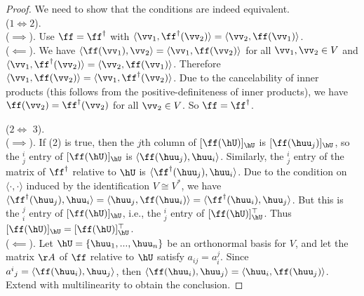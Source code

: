 \begin{proof}
    \mbox{} We need to show that the conditions are indeed equivalent.
    \\ \indent ($1 \iff 2$).
    \\ \indent ($\implies$). Use $\ff = \ff^\dag$ with $\langle \vv_1, \ff^\dag(\vv_2) \rangle = \langle \vv_2, \ff(\vv_1) \rangle$. 
    \\ \indent ($\impliedby$). We have $\langle \ff(\vv_1), \vv_2 \rangle = \langle \vv_1, \ff(\vv_2) \rangle$ for all $\vv_1, \vv_2 \in V$ and $\langle \vv_1, \ff^\dag(\vv_2) \rangle = \langle \vv_2, \ff(\vv_1) \rangle$. Therefore $\langle \vv_1, \ff(\vv_2) \rangle = \langle \vv_1, \ff^\dag(\vv_2) \rangle$. Due to the cancelability of inner products (this follows from the positive-definiteness of inner products), we have $\ff(\vv_2) = \ff^\dag(\vv_2)$ for all $\vv_2 \in V$. So $\ff = \ff^\dag$. 

    ($2 \iff $ 3). 
    \\ \indent ($\implies$). If (2) is true, then the $j$th column of $[\ff(\hU)]_{\hU}$ is $[\ff(\huu_j)]_{\hU}$, so the $^i_j$ entry of $[\ff(\hU)]_{\hU}$ is $\langle \ff(\huu_j), \huu_i \rangle$. Similarly, the $^i_j$ entry of the matrix of $\ff^\dag$ relative to $\hU$ is $\langle 
    \ff^\dag(\huu_j), \huu_i \rangle$. Due to the condition on $\langle \cdot, \cdot \rangle$ induced by the identification $V \cong V^*$, we have $\langle \ff^\dag(\huu_j), \huu_i \rangle = \langle \huu_j, \ff(\huu_i) \rangle = \langle \ff^\dag(\huu_i), \huu_j \rangle$. But this is the $^j_i$ entry of $[\ff(\hU)]_{\hU}$, i.e., the $^i_j$ entry of $[\ff(\hU)]_{\hU}^{\top}$. Thus $[\ff(\hU)]_{\hU} = [\ff(\hU)]_{\hU}^{\top}$.
    \\ \indent ($\impliedby$). Let $\hU = \{\huu_1, ..., \huu_n\}$ be an orthonormal basis for $V$, and let the matrix $\AA$ of $\ff$ relative to $\hU$ satisfy $a_{ij} = a^j_i$. Since $a^i{}_j = \langle \ff(\huu_i), \huu_j \rangle$, then $\langle \ff(\huu_i), \huu_j \rangle = \langle \huu_i, \ff(\huu_j) \rangle$. Extend with multilinearity to obtain the conclusion.
\end{proof}

